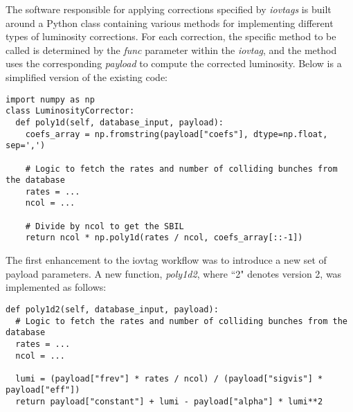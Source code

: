 The software responsible for applying corrections specified by \textit{iovtags} is built around a Python class containing various methods for implementing different types of luminosity corrections. For each correction, the specific method to be called is determined by the \textit{func} parameter within the \textit{iovtag}, and the method uses the corresponding \textit{payload} to compute the corrected luminosity. Below is a simplified version of the existing code:

\begin{lstlisting}
import numpy as np
class LuminosityCorrector:
  def poly1d(self, database_input, payload):
    coefs_array = np.fromstring(payload["coefs"], dtype=np.float, sep=',')

    # Logic to fetch the rates and number of colliding bunches from the database
    rates = ...
    ncol = ...

    # Divide by ncol to get the SBIL
    return ncol * np.poly1d(rates / ncol, coefs_array[::-1])
\end{lstlisting}

The first enhancement to the iovtag workflow was to introduce a new set of payload parameters. A new function, \textit{poly1d2}, where ``2" denotes version 2, was implemented as follows:

\begin{lstlisting}
def poly1d2(self, database_input, payload):
  # Logic to fetch the rates and number of colliding bunches from the database
  rates = ...
  ncol = ...

  lumi = (payload["frev"] * rates / ncol) / (payload["sigvis"] * payload["eff"])
  return payload["constant"] + lumi - payload["alpha"] * lumi**2
\end{lstlisting}





